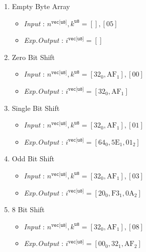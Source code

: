 \documentclass[../alan-handbook.tex]{subfiles}
\begin{document}
\begin{enumerate}
    \item Empty Byte Array
        \begin{itemize}
            \item \textit{Input} : $n^{\texttt{vec[u8]}},k^{\texttt{u8}} = [  ], [\text{05}]$
            \item \textit{Exp.Output} : $i^{\texttt{vec[u8]}} = [  ]$
        \end{itemize}
    \item Zero Bit Shift
        \begin{itemize}
            \item \textit{Input} : $n^{\texttt{vec[u8]}},k^{\texttt{u8}} = [\text{32}_0,\text{AF}_1], [\text{00}]$
            \item \textit{Exp.Output} : $i^{\texttt{vec[u8]}} = [\text{32}_0,\text{AF}_1]$
        \end{itemize}
    \item Single Bit Shift 
        \begin{itemize}
            \item \textit{Input} : $n^{\texttt{vec[u8]}},k^{\texttt{u8}} = [\text{32}_0,\text{AF}_1], [\text{01}]$
            \item \textit{Exp.Output} : $i^{\texttt{vec[u8]}} = [\text{64}_0,\text{5E}_1,\text{01}_2]$
        \end{itemize}
    \item Odd Bit Shift
        \begin{itemize}
            \item \textit{Input} : $n^{\texttt{vec[u8]}},k^{\texttt{u8}} = [\text{32}_0,\text{AF}_1], [\text{03}]$
            \item \textit{Exp.Output} : $i^{\texttt{vec[u8]}} = [\text{20}_0,\text{F3}_1,\text{0A}_2]$
        \end{itemize}
    \item 8 Bit Shift 
        \begin{itemize}
            \item \textit{Input} : $n^{\texttt{vec[u8]}},k^{\texttt{u8}} = [\text{32}_0,\text{AF}_1], [\text{08}]$
            \item \textit{Exp.Output} : $i^{\texttt{vec[u8]}} = [\text{00}_0,\text{32}_1,\text{AF}_2]$
        \end{itemize}
\end{enumerate}
\end{document}
